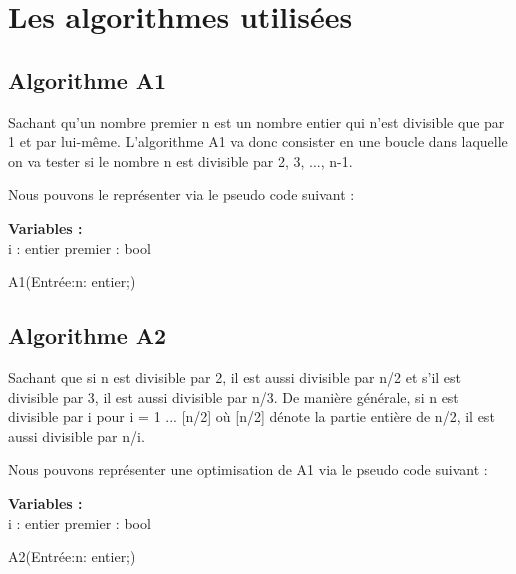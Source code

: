 \chapter{Les algorithmes utilisées}
\section{Algorithme A1}
 Sachant qu’un nombre premier n est un nombre entier qui n’est divisible que par 1 et par lui-même. L’algorithme A1 va donc consister en une boucle dans laquelle on va tester si le nombre n est divisible par 2, 3, ..., n-1.
\par
Nous pouvons le représenter via le pseudo code suivant :
\par
\begin{function}[H]
    \textbf{Variables :}\\
    i : entier\;
    premier : bool\;
    \caption{A1(Entrée:n: entier;)}
\end{function}
\newpage
\section{Algorithme A2}
 Sachant que si n est divisible par 2, il est aussi divisible par n/2 et s’il est divisible par 3, il est aussi divisible par n/3. De manière générale, si n est divisible par i pour i = 1 ... [n/2] où [n/2] dénote la partie entière de n/2, il est aussi divisible par n/i. 
 \par
Nous pouvons représenter une optimisation de A1 via le pseudo code suivant :

\par
\begin{function}[H]
    \textbf{Variables :}\\
    i : entier\;
    premier : bool\;
    \caption{A2(Entrée:n: entier;)}
\end{function}
\newpage

